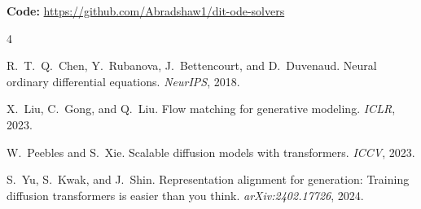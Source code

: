 \documentclass[10pt,twocolumn]{article}
\begin{document}
\vspace{0.5em}
\noindent\textbf{Code:} \url{https://github.com/Abradshaw1/dit-ode-solvers}

{\small

\begin{thebibliography}{4}

R.~T.~Q.~Chen, Y.~Rubanova, J.~Bettencourt, and D.~Duvenaud.
\newblock Neural ordinary differential equations.
\newblock \emph{NeurIPS}, 2018.

X.~Liu, C.~Gong, and Q.~Liu.
\newblock Flow matching for generative modeling.
\newblock \emph{ICLR}, 2023.

W.~Peebles and S.~Xie.
\newblock Scalable diffusion models with transformers.
\newblock \emph{ICCV}, 2023.

S.~Yu, S.~Kwak, and J.~Shin.
\newblock Representation alignment for generation: Training diffusion transformers is easier than you think.
\newblock \emph{arXiv:2402.17726}, 2024.

\end{thebibliography}
}
\end{document}
